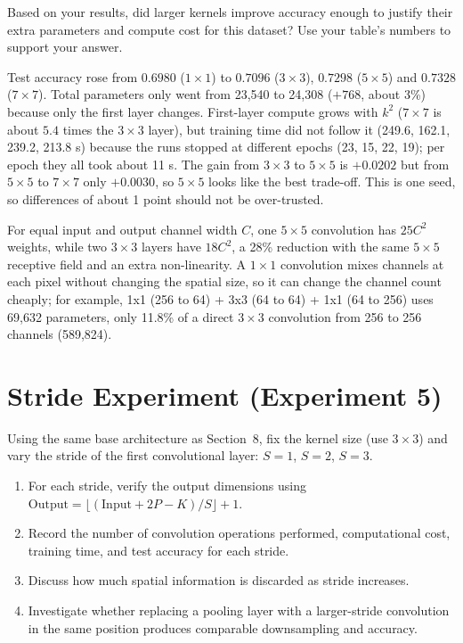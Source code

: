 \documentclass[12pt,a4paper]{article}
\begin{document}
\begin{tcolorbox}[colback=lightblue!40, colframe=myColorB, title={\textbf{8.4 --- Question}}, fonttitle=\small\bfseries, breakable]
Based on your results, did larger kernels improve accuracy enough to justify their
extra parameters and compute cost for this dataset? Use your table's numbers to
support your answer.
\end{tcolorbox}

\begin{answerbox}
Test accuracy rose from $0.6980$ ($1\times1$) to $0.7096$ ($3\times3$), $0.7298$ ($5\times5$) and $0.7328$
($7\times7$). Total parameters only went from 23,540 to 24,308 ($+768$, about 3\%) because only the first layer
changes. First-layer compute grows with $k^2$ ($7\times7$ is about $5.4$ times the $3\times3$ layer), but training
time did not follow it (249.6, 162.1, 239.2, 213.8 s) because the runs stopped at different epochs (23, 15,
22, 19); per epoch they all took about 11 s. The gain from $3\times3$ to $5\times5$ is $+0.0202$ but from
$5\times5$ to $7\times7$ only $+0.0030$, so $5\times5$ looks like the best trade-off. This is one seed, so
differences of about 1 point should not be over-trusted.
\par\smallskip
For equal input and output channel width $C$, one $5\times5$ convolution has $25C^2$ weights, while two
$3\times3$ layers have $18C^2$, a 28\% reduction with the same $5\times5$ receptive field and an extra
non-linearity. A $1\times1$ convolution mixes channels at each pixel without changing the spatial size, so it can
change the channel count cheaply; for example, 1x1 (256 to 64) + 3x3 (64 to 64) + 1x1 (64 to 256) uses 69,632
parameters, only 11.8\% of a direct $3\times3$ convolution from 256 to 256 channels (589,824).
\end{answerbox}

\section{Stride Experiment (Experiment 5)}

Using the same base architecture as Section~8, fix the kernel size (use $3\times3$)
and vary the stride of the first convolutional layer: $S=1$, $S=2$, $S=3$.

\begin{stepbox}
\begin{enumerate}[leftmargin=*, label=\arabic*.]
  \item For each stride, verify the output dimensions using
        $\text{Output} = \lfloor (\text{Input} + 2P - K)/S \rfloor + 1$.
  \item Record the number of convolution operations performed, computational cost,
        training time, and test accuracy for each stride.
  \item Discuss how much spatial information is discarded as stride increases.
  \item Investigate whether replacing a pooling layer with a larger-stride convolution
        in the same position produces comparable downsampling and accuracy.
\end{enumerate}
\end{stepbox}
\end{document}
